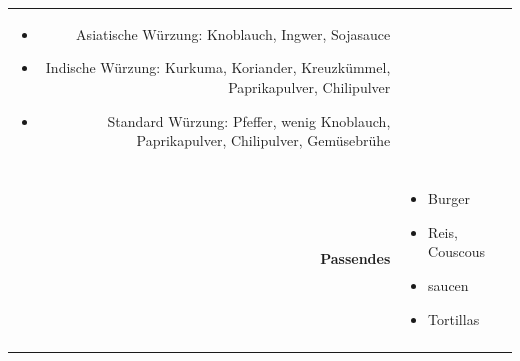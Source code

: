 \documentclass[a4paper, 12pt]{scrbook} 								%
\numberwithin{equation}{section} 									%
\begin{document}
\begin{tabularx}{\textwidth}{r|L}
\begin{itemize}[]
										\item Asiatische Würzung: Knoblauch, Ingwer, Sojasauce
										\item Indische Würzung: Kurkuma, Koriander, Kreuzkümmel, Paprikapulver, Chilipulver
										\item Standard Würzung: Pfeffer, wenig Knoblauch, Paprikapulver, Chilipulver, Gemüsebrühe
									\end{itemize}	\\
								&	\\	
		\textbf{Passendes}		&	\begin{itemize}[]
										\item Burger
										\item Reis, Couscous
										\item saucen
										\item Tortillas
									\end{itemize}	\\
								&	\\	
	\end{tabularx}
\end{document}
